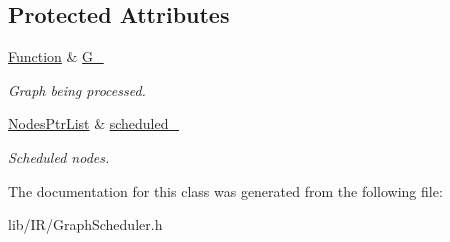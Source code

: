 \subsection*{Protected Attributes}
\begin{DoxyCompactItemize}
\item 
\mbox{\label{classglow_1_1_scheduler_a86e12333d7fbb1f5ed79ddbb5db18f34}} 
\hyperlink{classglow_1_1_function}{Function} \& \hyperlink{classglow_1_1_scheduler_a86e12333d7fbb1f5ed79ddbb5db18f34}{G\+\_\+}
\begin{DoxyCompactList}\small\item\em Graph being processed. \end{DoxyCompactList}\item 
\mbox{\label{classglow_1_1_scheduler_a6b57e246c16efac218f974b98d9e620b}} 
\hyperlink{namespaceglow_a40ec79a2f9c485bfa999ed31fd0854dd}{Nodes\+Ptr\+List} \& \hyperlink{classglow_1_1_scheduler_a6b57e246c16efac218f974b98d9e620b}{scheduled\+\_\+}
\begin{DoxyCompactList}\small\item\em Scheduled nodes. \end{DoxyCompactList}\end{DoxyCompactItemize}


The documentation for this class was generated from the following file\+:\begin{DoxyCompactItemize}
\item 
lib/\+I\+R/Graph\+Scheduler.\+h\end{DoxyCompactItemize}
